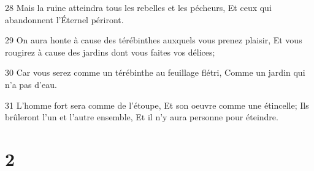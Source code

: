 \par 28 Mais la ruine atteindra tous les rebelles et les pécheurs, Et ceux qui abandonnent l'Éternel périront.
\par 29 On aura honte à cause des térébinthes auxquels vous prenez plaisir, Et vous rougirez à cause des jardins dont vous faites vos délices;
\par 30 Car vous serez comme un térébinthe au feuillage flétri, Comme un jardin qui n'a pas d'eau.
\par 31 L'homme fort sera comme de l'étoupe, Et son oeuvre comme une étincelle; Ils brûleront l'un et l'autre ensemble, Et il n'y aura personne pour éteindre.

\chapter{2}

